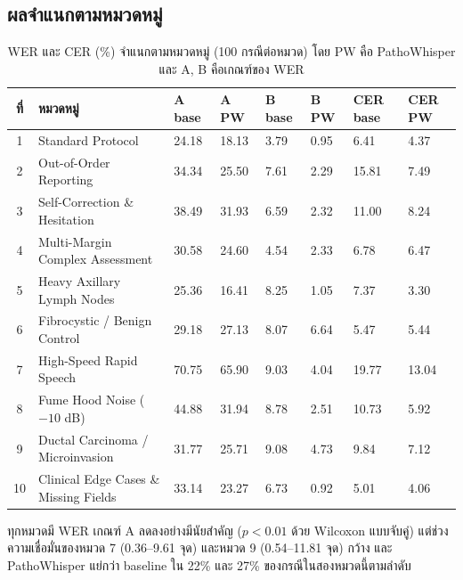 \subsection{ผลจำแนกตามหมวดหมู่}

\begin{table}[H]
\centering
\caption{WER และ CER (\%) จำแนกตามหมวดหมู่ (100 กรณีต่อหมวด) โดย PW คือ PathoWhisper และ A, B คือเกณฑ์ของ WER}
\label{tab:bycat}
\footnotesize\setlength{\tabcolsep}{3pt}
\begin{tabular}{|c|p{3.6cm}|p{1.25cm}|p{1.25cm}|p{1.25cm}|p{1.25cm}|p{1.35cm}|p{1.35cm}|}
\hline
\textbf{ที่} & \textbf{หมวดหมู่} & \textbf{A base} & \textbf{A PW} & \textbf{B base} & \textbf{B PW} & \textbf{CER base} & \textbf{CER PW} \\
\hline
1 & Standard Protocol & 24.18 & 18.13 & 3.79 & 0.95 & 6.41 & 4.37 \\
\hline
2 & Out-of-Order Reporting & 34.34 & 25.50 & 7.61 & 2.29 & 15.81 & 7.49 \\
\hline
3 & Self-Correction \& Hesitation & 38.49 & 31.93 & 6.59 & 2.32 & 11.00 & 8.24 \\
\hline
4 & Multi-Margin Complex Assessment & 30.58 & 24.60 & 4.54 & 2.33 & 6.78 & 6.47 \\
\hline
5 & Heavy Axillary Lymph Nodes & 25.36 & 16.41 & 8.25 & 1.05 & 7.37 & 3.30 \\
\hline
6 & Fibrocystic / Benign Control & 29.18 & 27.13 & 8.07 & 6.64 & 5.47 & 5.44 \\
\hline
7 & High-Speed Rapid Speech & 70.75 & 65.90 & 9.03 & 4.04 & 19.77 & 13.04 \\
\hline
8 & Fume Hood Noise ($-10$ dB) & 44.88 & 31.94 & 8.78 & 2.51 & 10.73 & 5.92 \\
\hline
9 & Ductal Carcinoma / Microinvasion & 31.77 & 25.71 & 9.08 & 4.73 & 9.84 & 7.12 \\
\hline
10 & Clinical Edge Cases \& Missing Fields & 33.14 & 23.27 & 6.73 & 0.92 & 5.01 & 4.06 \\
\hline
\end{tabular}
\end{table}

ทุกหมวดมี WER เกณฑ์ A ลดลงอย่างมีนัยสำคัญ ($p < 0.01$ ด้วย Wilcoxon แบบจับคู่) แต่ช่วงความเชื่อมั่นของหมวด 7 (0.36--9.61 จุด) และหมวด 9 (0.54--11.81 จุด) กว้าง และ PathoWhisper แย่กว่า baseline ใน 22\% และ 27\% ของกรณีในสองหมวดนี้ตามลำดับ

